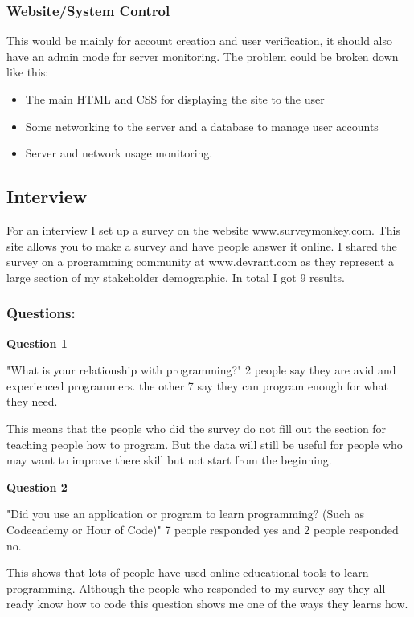 \documentclass[12pt]{article}
\begin{document}
\subsubsection{Website/System Control}
This would be mainly for account creation and user verification, it should also have an admin mode for server monitoring. The problem could be broken down like this:
\begin{itemize}
    \item The main HTML and CSS for displaying the site to the user
    \item Some networking to the server and a database to manage user accounts
    \item Server and network usage monitoring.
\end{itemize}

\newpage
\subsection{Interview}
For an interview I set up a survey on the website www.surveymonkey.com. This site allows you to make a survey and have people answer it online. I shared the survey on a programming community at www.devrant.com as they represent a large section of my stakeholder demographic. In total I got 9 results.


\subsubsection{Questions:}
\textbf{Question 1}

"What is your relationship with programming?"
2 people say they are avid and experienced programmers.
the other 7 say they can program enough for what they need.

This means that the people who did the survey do not fill out the section for teaching people how to program. But the data will still be useful for people who may want to improve there skill but not start from the beginning.


\textbf{Question 2}

"Did you use an application or program to learn programming? (Such as Codecademy or Hour of Code)"
7 people responded yes and 2 people responded no.

This shows that lots of people have used online educational tools to learn programming. Although the people who responded to my survey say they all ready know how to code this question shows me one of the ways they learns how.
\end{document}
